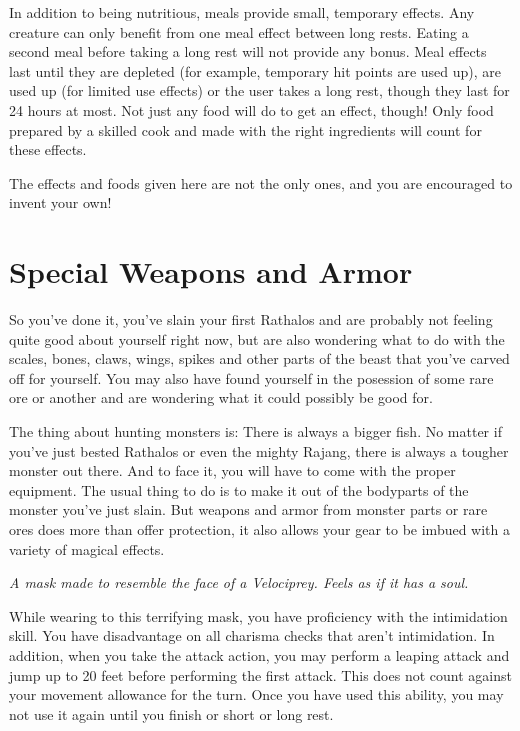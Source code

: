 In addition to being nutritious, meals provide small, temporary effects. Any creature can only benefit from one meal effect between long rests. Eating a second meal before taking a long rest will not provide any bonus. Meal effects last until they are depleted (for example, temporary hit points are used up), are used up (for limited use effects) or the user takes a long rest, though they last for 24 hours at most. Not just any food will do to get an effect, though! Only food prepared by a skilled cook and made with the right ingredients will count for these effects.

The effects and foods given here are not the only ones, and you are encouraged to invent your own!

\newpage
{}
\null

\clearpage
\section{Special Weapons and Armor}
So you've done it, you've slain your first Rathalos and are probably not feeling quite good about yourself right now, but are also wondering what to do with the scales, bones, claws, wings, spikes and other parts of the beast that you've carved off for yourself. You may also have found yourself in the posession of some rare ore or another and are wondering what it could possibly be good for.

The thing about hunting monsters is: There is always a bigger fish. No matter if you've just bested Rathalos or even the mighty Rajang, there is always a tougher monster out there. And to face it, you will have to come with the proper equipment. The usual thing to do is to make it out of the bodyparts of the monster you've just slain. But weapons and armor from monster parts or rare ores does more than offer protection, it also allows your gear to be imbued with a variety of magical effects.

\textit{A mask made to resemble the face of a Velociprey. Feels as if it has a soul.}

While wearing to this terrifying mask, you have proficiency with the intimidation skill. You have disadvantage on all charisma checks that aren't intimidation. In addition, when you take the attack action, you may perform a leaping attack and jump up to 20 feet before performing the first attack. This does not count against your movement allowance for the turn. Once you have used this ability, you may not use it again until you finish or short or long rest.

